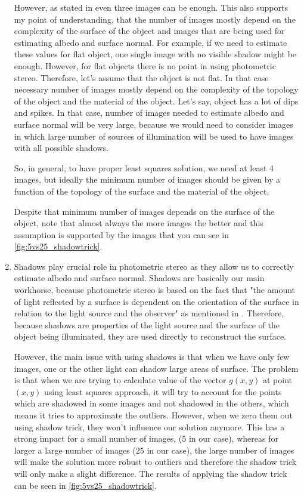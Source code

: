 \documentclass{article}
\begin{document}
\begin{enumerate}
    
    However, as stated in \cite{shadows} even three images can be enough. This also supports my point of understanding, that the number of images mostly depend on the complexity of the surface of the object and images that are being used for estimating albedo and surface normal. For example, if we need to estimate these values for flat object, one single image with no visible shadow might be enough. However, for flat objects there is no point in using photometric stereo. Therefore, let's assume that the object is not flat. In that case necessary number of images mostly depend on the complexity of the topology of the object and the material of the object. Let's say, object has a lot of dips and spikes. In that case, number of images needed to estimate albedo and surface normal will be very large, because we would need to consider images in which large number of sources of illumination will be used to have images with all possible shadows. 

    
    So, in general, to have proper least squares solution, we need at least 4 images, but ideally the minimum number of images should be given by a function of the topology of the surface and the material of the object.
    
    Despite that minimum number of images depends on the surface of the object, note that almost always the more images the better and this assumption is supported by the images that you can see in \cref{fig:5vs25_shadowtrick}.

        
    \item Shadows play crucial role in photometric stereo as they allow us to correctly estimate albedo and surface normal. Shadows are basically our main workhorse, because photometric stereo is based on the fact that "the amount of light reflected by a surface is dependent on the orientation of the surface in relation to the light source and the observer" as mentioned in \cite{wiki}. Therefore, because shadows are properties of the light source and the surface of the object being illuminated, they are used directly to reconstruct the surface.
    
    However, the main issue with using shadows is that when we have only few images, one or the other light can shadow large areas of surface. The problem is that when we are trying to calculate value of the vector $g(x,y)$ at point $(x, y)$ using least squares approach, it will try to account for the points which are shadowed in some images and not shadowed in the others, which means it tries to approximate the outliers. However, when we zero them out using shadow trick, they won't influence our solution anymore. This has a strong impact for a small number of images, (5 in our case), whereas for larger a large number of images (25 in our case), the large number of images will make the solution more robust to outliers and therefore the shadow trick will only make a slight difference. The results of applying the shadow trick can be seen in \cref{fig:5vs25_shadowtrick}.
    

\end{enumerate}
\end{document}
